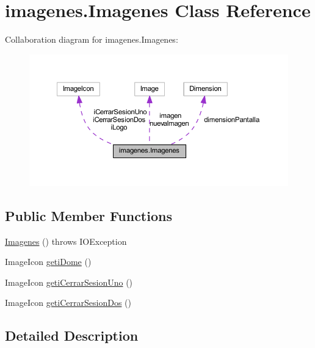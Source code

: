 \hypertarget{classimagenes_1_1_imagenes}{}\section{imagenes.\+Imagenes Class Reference}
\label{classimagenes_1_1_imagenes}


Collaboration diagram for imagenes.\+Imagenes\+:\nopagebreak
\begin{figure}[H]
\begin{center}
\leavevmode
\includegraphics[width=350pt]{classimagenes_1_1_imagenes__coll__graph}
\end{center}
\end{figure}
\subsection*{Public Member Functions}
\begin{DoxyCompactItemize}
\item 
\mbox{\hyperlink{classimagenes_1_1_imagenes_a5306d3993cd1796bb3e7a027a5f2090c}{Imagenes}} ()  throws I\+O\+Exception 
\item 
Image\+Icon \mbox{\hyperlink{classimagenes_1_1_imagenes_a0f0caa5031d91592dd10a958b6b3bca0}{geti\+Dome}} ()
\item 
Image\+Icon \mbox{\hyperlink{classimagenes_1_1_imagenes_a35ea6dc13b089bcc087f73b5f5779219}{geti\+Cerrar\+Sesion\+Uno}} ()
\item 
Image\+Icon \mbox{\hyperlink{classimagenes_1_1_imagenes_a6ba10d5d816cbdf459d769b884940967}{geti\+Cerrar\+Sesion\+Dos}} ()
\end{DoxyCompactItemize}


\subsection{Detailed Description}


